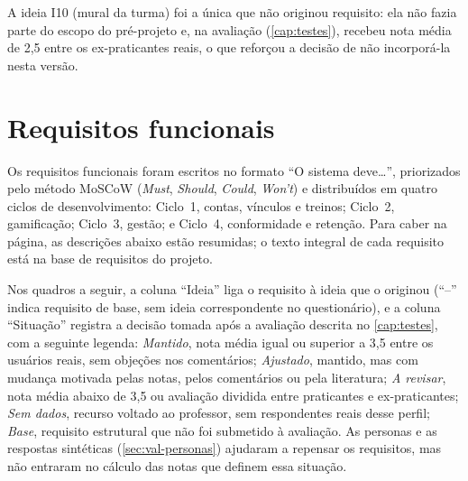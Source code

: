 A ideia I10 (mural da turma) foi a única que não originou requisito: ela
não fazia parte do escopo do pré-projeto e, na avaliação
(\autoref{cap:testes}), recebeu nota média de 2,5 entre os
ex-praticantes reais, o que reforçou a decisão de não incorporá-la nesta
versão.

\section{Requisitos funcionais}
\label{sec:rf}

Os requisitos funcionais foram escritos no formato ``O sistema deve\ldots'',
priorizados pelo método MoSCoW (\textit{Must}, \textit{Should},
\textit{Could}, \textit{Won't}) e distribuídos em quatro ciclos de
desenvolvimento: Ciclo~1, contas, vínculos e treinos; Ciclo~2,
gamificação; Ciclo~3, gestão; e Ciclo~4, conformidade e retenção. Para
caber na página, as descrições abaixo estão resumidas; o texto integral de
cada requisito está na base de requisitos do projeto.

Nos quadros a seguir, a coluna ``Ideia'' liga o requisito à ideia que o
originou (``--'' indica requisito de base, sem ideia correspondente no
questionário), e a coluna ``Situação'' registra a decisão tomada após a
avaliação descrita no \autoref{cap:testes}, com a seguinte legenda:
\textit{Mantido}, nota média igual ou superior a 3,5 entre os usuários
reais, sem objeções nos comentários; \textit{Ajustado}, mantido, mas com
mudança motivada pelas notas, pelos comentários ou pela literatura;
\textit{A revisar}, nota média abaixo de 3,5 ou avaliação dividida entre
praticantes e ex-praticantes; \textit{Sem dados}, recurso voltado ao
professor, sem respondentes reais desse perfil; \textit{Base}, requisito
estrutural que não foi submetido à avaliação. As personas e as respostas
sintéticas (\autoref{sec:val-personas}) ajudaram a repensar os
requisitos, mas não entraram no cálculo das notas que definem essa
situação.

